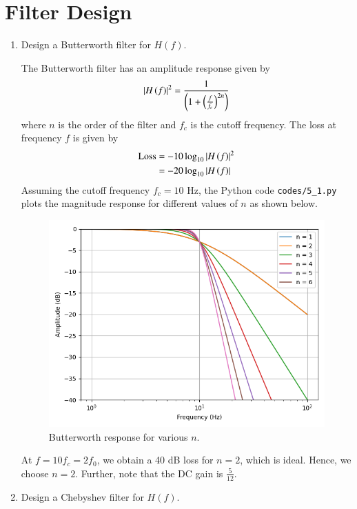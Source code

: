 \documentclass[journal,12pt,twocolumn]{IEEEtran}
\renewcommand\thesection{\arabic{section}}
\begin{document}
\section{Filter Design}
\begin{enumerate}[label=\thesection.\arabic*
,ref=\thesection.\theenumi]
\item Design a Butterworth filter for $H(f)$.

\solution The Butterworth filter has an amplitude response
given by
\begin{align}
    \left\vert H\left(f\right)\right\vert^2 = \frac{1}{\left(1 + \left(\frac{f}{f_c}\right)^{2n}\right)}
\end{align}
where $n$ is the order of the filter and $f_c$ is the cutoff
frequency. The loss at frequency $f$ is given by 
\begin{align}
    \text{Loss} &= -10\log_{10}\left\vert H\left(f\right)\right\vert^2 \\
                &= -20\log_{10}\left\vert H\left(f\right)\right\vert
\end{align}
Assuming the cutoff frequency $f_c = 10$ Hz, the Python code
\texttt{codes/5\_1.py} plots the magnitude response for different 
values of $n$ as shown below.
\begin{figure}[!ht]
    \includegraphics[width=\columnwidth]{figs/5_1.png}
    \caption{Butterworth response for various $n$.}
    \label{fig:butter-resp}
\end{figure}
At $f = 10f_c = 2f_0$, we obtain a 40 dB loss for $n = 2$, which is
ideal. Hence, we choose $n = 2$. Further, note that the
DC gain is $\frac{5}{12}$.

\item Design a Chebyshev filter for $H(f)$.


\end{enumerate}
\end{document}
